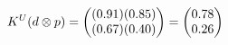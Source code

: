 \documentclass[preview]{standalone}
\begin{document}
\begin{align*}
\special{dvisvgm:raw <g id='unique000'>}K^U(d \otimes p) = \begin{pmatrix} (0.91)(0.85) \\ (0.67)(0.40) \end{pmatrix} = \begin{pmatrix} 0.78 \\ 0.26 \end{pmatrix}\special{dvisvgm:raw </g>}
\end{align*}
\end{document}
